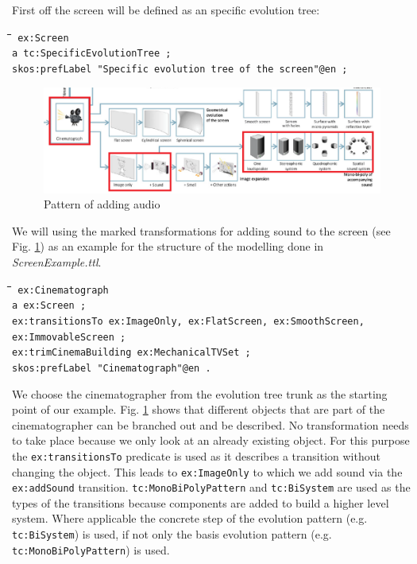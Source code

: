 \documentclass[11pt,a4paper]{article}
\newenvironment{code}{\tt \begin{tabbing}
\hskip12pt\=\hskip12pt\=\hskip12pt\=\hskip12pt\=\hskip5cm\=\hskip5cm\=\kill}
{\end{tabbing}}
\begin{document}
First off the screen will be defined as an specific evolution tree:
\begin{code}\tt
ex:Screen \\
\> a tc:SpecificEvolutionTree ; \\
\>\> skos:prefLabel "Specific evolution tree of the screen"@en ;
\end{code}

\begin{figure}[htb]
	\centering
	\includegraphics[width=\linewidth]{figures/audio.png}
	\caption{\small Pattern of adding audio \cite{Shpakovsky2016}}
	\label{fig:audio}
\end{figure}

We will using the marked transformations for adding sound to the screen (see Fig. \ref{fig:audio}) as an example for the structure of the modelling done in \textit{ScreenExample.ttl}. 

\begin{code}\tt
ex:Cinematograph \\
\> a ex:Screen ; \\
\> ex:transitionsTo ex:ImageOnly, ex:FlatScreen, ex:SmoothScreen, ex:ImmovableScreen ;\\
\> ex:trimCinemaBuilding ex:MechanicalTVSet ;\\
\> skos:prefLabel "Cinematograph"@en .\\
\end{code}

We choose the cinematographer from the evolution tree trunk as the starting point of our example. Fig. \ref{fig:audio} shows that different objects that are part of the cinematographer can be branched out and be described. No transformation needs to take place because we only look at an already existing object. For this purpose the \texttt{ex:transitionsTo} predicate is used as it describes a transition without changing the object. This leads to \texttt{ex:ImageOnly} to which we add sound via the \texttt{ex:addSound} transition. \texttt{tc:MonoBiPolyPattern} and \texttt{tc:BiSystem} are used as the types of the transitions because components are added to build a higher level system. Where applicable the concrete step of the evolution pattern (e.g. \texttt{tc:BiSystem}) is used, if not only the basis evolution pattern (e.g. \texttt{tc:MonoBiPolyPattern}) is used.
\end{document}
